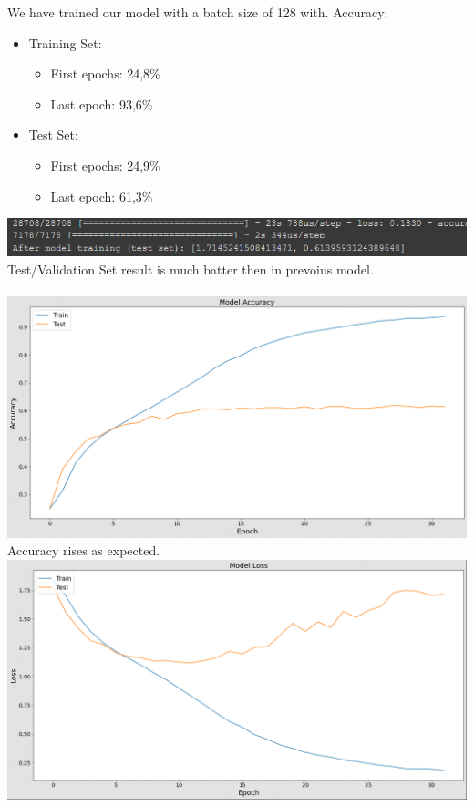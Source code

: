 We have trained our model with a batch size of 128 with.
Accuracy:
\begin{itemize}
      \item Training Set:
        \begin{itemize}
            \item First epochs: 24,8\%
            \item Last epoch: 93,6\%
        \end{itemize}
      \item Test Set:
        \begin{itemize}
            \item First epochs: 24,9\%
            \item Last epoch: 61,3\%
        \end{itemize}
\end{itemize}
\includegraphics[scale=0.9]{images/modelTwo/evalutaionTwo.png}
Test/Validation Set result is much batter then in prevoius model.\\
\\
\includegraphics[scale=0.5]{images/modelTwo/accTwo.png}
Accuracy rises as expected.\\
\newpage
\includegraphics[scale=0.5]{images/modelTwo/lossTwo.png}
